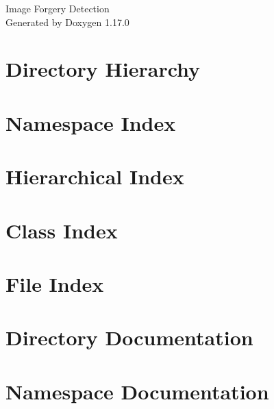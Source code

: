\documentclass[twoside]{book}
\newcommand{\+}{\discretionary{\mbox{\scriptsize$\hookleftarrow$}}{}{}}
\newcommand{\clearemptydoublepage}{%
    \newpage{\pagestyle{empty}\cleardoublepage}%
  }
\begin{document}
  \raggedbottom
    \hypersetup{pageanchor=false,
                bookmarksnumbered=true,
                pdfencoding=unicode
               }
  \begin{titlepage}
  \vspace*{7cm}
  \begin{center}%
  {\Large Image Forgery Detection}\\
  \vspace*{1cm}
  {\large Generated by Doxygen 1.17.0}\\
  \end{center}
  \end{titlepage}
  \clearemptydoublepage
  \tableofcontents
  \clearemptydoublepage
  \hypersetup{pageanchor=true}


\chapter{Directory Hierarchy}

\chapter{Namespace Index}

\chapter{Hierarchical Index}

\chapter{Class Index}

\chapter{File Index}

\chapter{Directory Documentation}

\chapter{Namespace Documentation}




\end{document}
